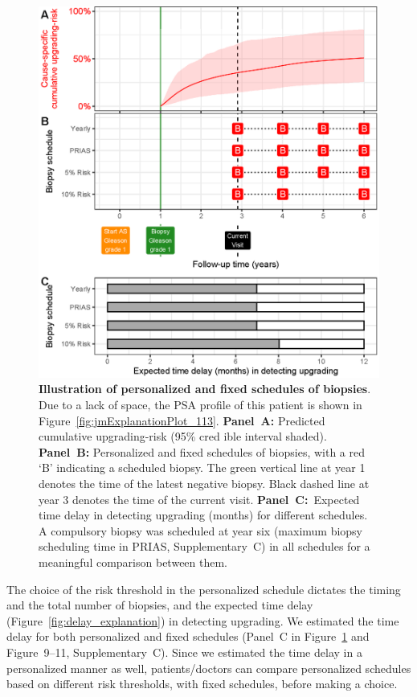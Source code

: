 \begin{figure}
\centerline{\includegraphics[width=\columnwidth]{images/demo_pat1.eps}}
\caption{\textbf{Illustration of personalized and fixed schedules of biopsies}. Due to a lack of space, the PSA profile of this patient is shown in Figure~\ref{fig:jmExplanationPlot_113}. \textbf{Panel~A:} Predicted cumulative upgrading-risk (95\% cred
ible interval shaded). \textbf{Panel~B:} Personalized and fixed schedules of biopsies, with a red `B' indicating a scheduled biopsy. The green vertical line at year 1 denotes the time of the latest negative biopsy. Black dashed line at year 3 denotes the time of the current visit. \textbf{Panel~C:}\ Expected time delay in detecting upgrading (months) for different schedules. A compulsory biopsy was scheduled at year six (maximum biopsy scheduling time in PRIAS, Supplementary~C) in all schedules for a meaningful comparison between them.}
\label{fig:demo_pat1}
\end{figure}

The choice of the risk threshold in the personalized schedule dictates the timing and the total number of biopsies, and the expected time delay (Figure~\ref{fig:delay_explanation}) in detecting upgrading. We estimated the time delay for both personalized and fixed schedules (Panel~C in Figure~\ref{fig:demo_pat1} and Figure~9--11, Supplementary~C). Since we estimated the time delay in a personalized manner as well, patients/doctors can compare personalized schedules based on different risk thresholds, with fixed schedules, before making a choice.


